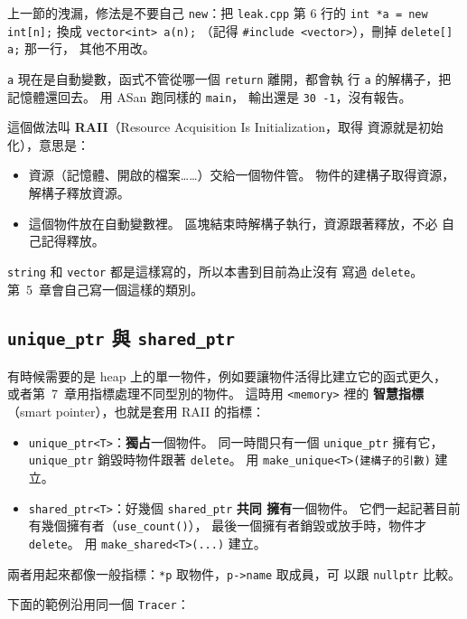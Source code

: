 上一節的洩漏，修法是不要自己 \texttt{new}：把 \texttt{leak.cpp} 第
$6$ 行的 \texttt{int *a = new int[n];} 換成 \texttt{vector<int> a(n);}
（記得 \texttt{\#include <vector>}），刪掉 \texttt{delete[] a;} 那一行，
其他不用改。

\texttt{a} 現在是自動變數，函式不管從哪一個 \texttt{return} 離開，都會執
行 \texttt{a} 的解構子，把記憶體還回去。 用 ASan 跑同樣的 \texttt{main}，
輸出還是 \texttt{30 -1}，沒有報告。

這個做法叫 \textbf{RAII}（Resource Acquisition Is Initialization，取得
資源就是初始化），意思是：

\begin{itemize}
\item 資源（記憶體、開啟的檔案……）交給一個物件管。 物件的建構子取得資源，
解構子釋放資源。
\item 這個物件放在自動變數裡。 區塊結束時解構子執行，資源跟著釋放，不必
自己記得釋放。
\end{itemize}

\texttt{string} 和 \texttt{vector} 都是這樣寫的，所以本書到目前為止沒有
寫過 \texttt{delete}。 第~5~章會自己寫一個這樣的類別。

\subsection{\texttt{unique\_ptr} 與 \texttt{shared\_ptr}}

有時候需要的是 heap 上的單一物件，例如要讓物件活得比建立它的函式更久，
或者第~7~章用指標處理不同型別的物件。 這時用 \texttt{<memory>} 裡的
\textbf{智慧指標}（smart pointer），也就是套用 RAII 的指標：

\begin{itemize}
\item \texttt{unique\_ptr<T>}：\textbf{獨占}一個物件。 同一時間只有一個
\texttt{unique\_ptr} 擁有它，\texttt{unique\_ptr} 銷毀時物件跟著
\texttt{delete}。 用 \texttt{make\_unique<T>(建構子的引數)} 建立。
\item \texttt{shared\_ptr<T>}：好幾個 \texttt{shared\_ptr} \textbf{共同
擁有}一個物件。 它們一起記著目前有幾個擁有者（\texttt{use\_count()}），
最後一個擁有者銷毀或放手時，物件才 \texttt{delete}。 用
\texttt{make\_shared<T>(...)} 建立。
\end{itemize}

兩者用起來都像一般指標：\texttt{*p} 取物件，\texttt{p->name} 取成員，可
以跟 \texttt{nullptr} 比較。

下面的範例沿用同一個 \texttt{Tracer}：

